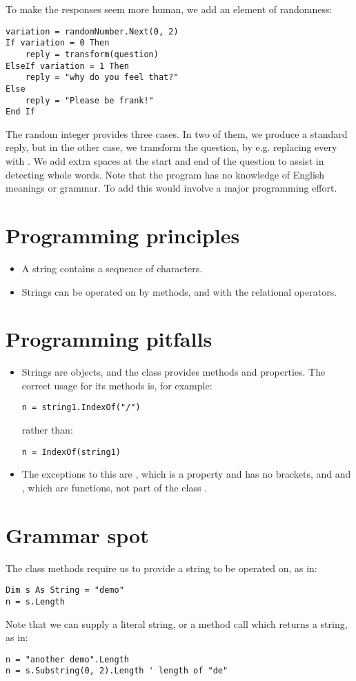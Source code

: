 		To make the responses seem more human, we add an element of randomness:
		\begin{lstlisting}
variation = randomNumber.Next(0, 2)
If variation = 0 Then
	reply = transform(question)
ElseIf variation = 1 Then
	reply = "why do you feel that?"
Else
	reply = "Please be frank!"
End If
		\end{lstlisting}
		The random integer provides three cases. In two of them, we produce a standard reply, but in the other case, we transform the question, by e.g. replacing every  with . We add extra spaces at the start and end of the question to assist in detecting whole words. Note that the program has no knowledge of English meanings or grammar. To add this would involve a major programming effort.


	\section{Programming principles}
		\begin{itemize}
      \item A string contains a sequence of characters.
      \item Strings can be operated on by methods, and with the relational operators.
		\end{itemize}


	\section{Programming pitfalls}
	\begin{itemize}
      \item Strings are objects, and the  class provides methods and properties. 
				The correct usage for its methods is, for example:
				\begin{lstlisting}
n = string1.IndexOf("/")
				\end{lstlisting}
				rather than:
				\begin{lstlisting}
n = IndexOf(string1)
				\end{lstlisting}
      \item The exceptions to this are , which is a property and has no brackets, and  and , which are functions, not part of the class .
	\end{itemize}


	\section{Grammar spot}
		The  class methods require us to provide a string to be operated on, as in:
		\begin{lstlisting}
Dim s As String = "demo"
n = s.Length
		\end{lstlisting}
		Note that we can supply a literal string, or a method call which returns a string, as in:
		\begin{lstlisting}
n = "another demo".Length
n = s.Substring(0, 2).Length ' length of "de"
		\end{lstlisting}


